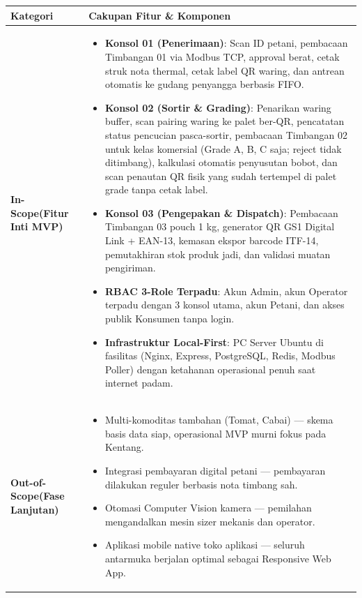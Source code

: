 \documentclass[12pt,a4paper]{article}
\begin{document}
\begin{longtable}{@{}>{\raggedright\arraybackslash}p{4.2cm}>{\raggedright\arraybackslash}p{10.8cm}@{}}
\toprule
\textbf{Kategori} & \textbf{Cakupan Fitur \& Komponen} \\
\midrule
\endhead
\textbf{In-Scope\newline(Fitur Inti MVP)} &
\begin{itemize}
  \item \textbf{Konsol 01 (Penerimaan)}: Scan ID petani, pembacaan Timbangan 01 via Modbus TCP, approval berat, cetak struk nota thermal, cetak label QR waring, dan antrean otomatis ke gudang penyangga berbasis FIFO.
  \item \textbf{Konsol 02 (Sortir \& Grading)}: Penarikan waring buffer, scan pairing waring ke palet ber-QR, pencatatan status pencucian pasca-sortir, pembacaan Timbangan 02 untuk kelas komersial (Grade A, B, C saja; reject tidak ditimbang), kalkulasi otomatis penyusutan bobot, dan scan penautan QR fisik yang sudah tertempel di palet grade tanpa cetak label.
  \item \textbf{Konsol 03 (Pengepakan \& Dispatch)}: Pembacaan Timbangan 03 pouch 1 kg, generator QR GS1 Digital Link + EAN-13, kemasan ekspor barcode ITF-14, pemutakhiran stok produk jadi, dan validasi muatan pengiriman.
  \item \textbf{RBAC 3-Role Terpadu}: Akun Admin, akun Operator terpadu dengan 3 konsol utama, akun Petani, dan akses publik Konsumen tanpa login.
  \item \textbf{Infrastruktur Local-First}: PC Server Ubuntu di fasilitas (Nginx, Express, PostgreSQL, Redis, Modbus Poller) dengan ketahanan operasional penuh saat internet padam.
\end{itemize} \\
\hline
\textbf{Out-of-Scope\newline(Fase Lanjutan)} &
\begin{itemize}
  \item Multi-komoditas tambahan (Tomat, Cabai) --- skema basis data siap, operasional MVP murni fokus pada Kentang.
  \item Integrasi pembayaran digital petani --- pembayaran dilakukan reguler berbasis nota timbang sah.
  \item Otomasi Computer Vision kamera --- pemilahan mengandalkan mesin sizer mekanis dan operator.
  \item Aplikasi mobile native toko aplikasi --- seluruh antarmuka berjalan optimal sebagai Responsive Web App.
\end{itemize} \\
\bottomrule
\end{longtable}
\end{document}
